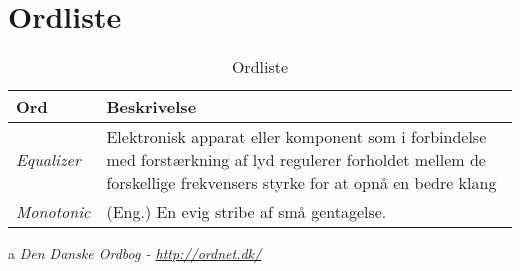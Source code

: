 \chapter{Ordliste} \label{bilag:ordliste}

\begin{table}[h!]
	\centering
	\caption{Ordliste}
	\label{tab:ordliste}
	\begin{threeparttable}
		\begin{tabular}{l l}
			\toprule
			\multicolumn{1}{l}{Ord}       &
			\multicolumn{1}{l}{Beskrivelse}  \\ 
			\midrule
			\textit{Equalizer}		& Elektronisk apparat eller komponent som i forbindelse med forstærkning af lyd regulerer forholdet mellem de forskellige frekvensers styrke for at opnå en bedre klang \tnote{a} \\
			\textit{Monotonic}		& (Eng.) En evig stribe af små gentagelse.  \tnote{a}\\
			\bottomrule
		\end{tabular}
	\begin{tablenotes}
		\item[a] \textit{Den Danske Ordbog - \url{http://ordnet.dk/}}
	\end{tablenotes}
	\end{threeparttable}
\end{table}
